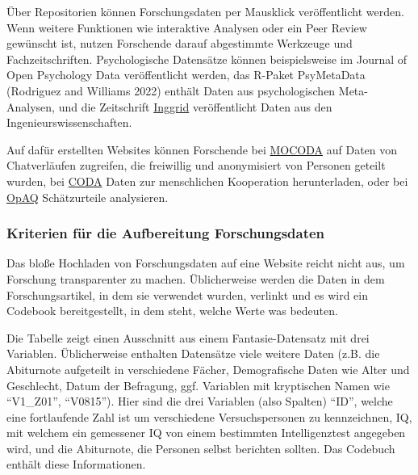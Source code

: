 \documentclass[
  letterpaper,
  DIV=11,
  numbers=noendperiod]{scrreprt}
\begin{document}
\begin{tcolorbox}[enhanced jigsaw, title=\textcolor{quarto-callout-warning-color}{\faExclamationTriangle}\hspace{0.5em}{Wo werden Forschungsdaten veröffentlicht?}, colbacktitle=quarto-callout-warning-color!10!white, rightrule=.15mm, titlerule=0mm, left=2mm, bottomrule=.15mm, arc=.35mm, leftrule=.75mm, toprule=.15mm, opacityback=0, breakable, bottomtitle=1mm, colframe=quarto-callout-warning-color-frame, toptitle=1mm, opacitybacktitle=0.6, coltitle=black, colback=white]

Über Repositorien können Forschungsdaten per Mausklick veröffentlicht
werden. Wenn weitere Funktionen wie interaktive Analysen oder ein Peer
Review gewünscht ist, nutzen Forschende darauf abgestimmte Werkzeuge und
Fachzeitschriften. Psychologische Datensätze können beispielsweise im
Journal of Open Psychology Data veröffentlicht werden, das R-Paket
PsyMetaData (Rodriguez and Williams 2022) enthält Daten aus
psychologischen Meta-Analysen, und die Zeitschrift
\href{https://www.inggrid.org}{Inggrid} veröffentlicht Daten aus den
Ingenieurswissenschaften.

Auf dafür erstellten Websites können Forschende bei
\href{https://db.mocoda2.de}{MOCODA} auf Daten von Chatverläufen
zugreifen, die freiwillig und anonymisiert von Personen geteilt wurden,
bei \href{https://cooperationdatabank.org}{CODA} Daten zur menschlichen
Kooperation herunterladen, oder bei
\href{https://metaanalyses.shinyapps.io/OpAQ/}{OpAQ} Schätzurteile
analysieren.

\end{tcolorbox}

\subsubsection{Kriterien für die Aufbereitung
Forschungsdaten}\label{kriterien-fuxfcr-die-aufbereitung-forschungsdaten}

Das bloße Hochladen von Forschungsdaten auf eine Website reicht nicht
aus, um Forschung transparenter zu machen. Üblicherweise werden die
Daten in dem Forschungsartikel, in dem sie verwendet wurden, verlinkt
und es wird ein Codebook bereitgestellt, in dem steht, welche Werte was
bedeuten.

Die Tabelle zeigt einen Ausschnitt aus einem Fantasie-Datensatz mit drei
Variablen. Üblicherweise enthalten Datensätze viele weitere Daten (z.B.
die Abiturnote aufgeteilt in verschiedene Fächer, Demografische Daten
wie Alter und Geschlecht, Datum der Befragung, ggf. Variablen mit
kryptischen Namen wie ``V1\_Z01'', ``V0815''). Hier sind die drei
Variablen (also Spalten) ``ID'', welche eine fortlaufende Zahl ist um
verschiedene Versuchspersonen zu kennzeichnen, IQ, mit welchem ein
gemessener IQ von einem bestimmten Intelligenztest angegeben wird, und
die Abiturnote, die Personen selbst berichten sollten. Das Codebuch
enthält diese Informationen.
\end{document}
